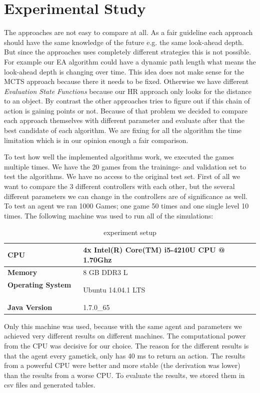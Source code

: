 
\section{Experimental Study} 
\label{sec:exp}

The approaches are not easy to compare at all. As a fair guideline each approach should have the same knowledge of the future e.g. the same look-ahead depth.
But since the approaches uses completely different strategies this is not possible. For example our \ac{EA} algorithm could have a
dynamic path length what means the look-ahead depth is changing over time. This idea does not make sense for the \ac{MCTS} approach because there it needs
to be fixed. Otherwise we have different \textit{Evaluation State Functions} because our \ac{HR} approach only looks for the distance to an object. By contrast 
the other approaches tries to figure out if this chain of action is gaining points or not.
Because of that problem we decided to compare each approach themselves with different parameter and evaluate after that the best candidate of each algorithm.
We are fixing for all the algorithm the time limitation which is in our opinion enough a fair comparison.

To test how well the implemented algorithms work, we executed the games multiple times. We have the 20 games from the trainings- and validation set to test the algorithms. We have no access to the original test set. First of all we want to compare the 3 different controllers with each other, but the several different parameters we can change in the controllers are of significance as well.
To test an agent we ran 1000 Games; one game 50 times and one single level 10 times. The following machine was used to run all of the simulations:

\begin{table}
\center
\begin{tabular}{ll} 
\textbf{CPU} & 4x Intel(R) Core(TM) i5-4210U CPU @ 1.70Ghz \\ \hline
\textbf{Memory} & 8 GB DDR3 L \\  \hline
\textbf{Operating System} \mbox{   } & Ubuntu 14.04.1 LTS \\  \hline
\textbf{Java Version} &  1.7.0\_65\\  
\end{tabular}
\caption{experiment setup}
\end{table}


Only this machine was used, because with the same agent and parameters we achieved very different results on different machines. The computational power from the CPU was decisive for our choice. The reason for the different results is that the agent every gametick, only has 40 ms to return an action. The results from a powerful CPU were better and more stable (the derivation was lower) than the results from a worse CPU. To evaluate the results, we stored them in csv files and generated tables.

